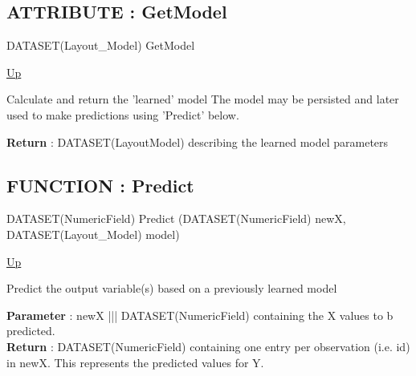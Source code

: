 \subsection*{ATTRIBUTE : GetModel}
\hypertarget{ecldoc:ml_core.interfaces.iregression.getmodel}{}
\begin{minipage}[t]{\textwidth}
\begin{flushleft}
DATASET(Layout\_Model) GetModel 
\end{flushleft}
\end{minipage}
\hyperlink{ecldoc:ml_core.interfaces.iregression}{Up}

\par
Calculate and return the 'learned' model The model may be persisted and later used to make predictions using 'Predict' below.
\par
\textbf{Return} : DATASET(LayoutModel) describing the learned model parameters \\
\subsection*{FUNCTION : Predict}
\hypertarget{ecldoc:ml_core.interfaces.iregression.predict}{}
\begin{minipage}[t]{\textwidth}
\begin{flushleft}
DATASET(NumericField) Predict (DATASET(NumericField) newX, DATASET(Layout\_Model) model)
\end{flushleft}
\end{minipage}
\hyperlink{ecldoc:ml_core.interfaces.iregression}{Up}

\par
Predict the output variable(s) based on a previously learned model
\par
\textbf{Parameter} : newX ||| DATASET(NumericField) containing the X values to b predicted. \\
\textbf{Return} : DATASET(NumericField) containing one entry per observation (i.e. id) in newX. This represents the predicted values for Y. \\

